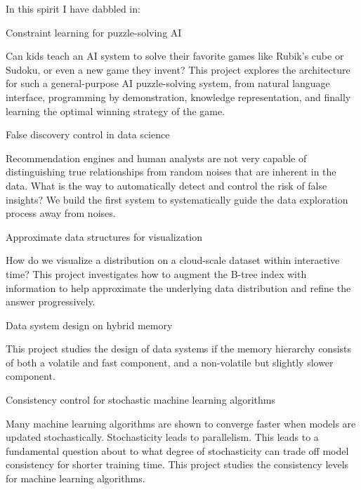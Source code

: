 \documentclass[letterpaper]{article}
\renewenvironment{itemize}{
  \begin{list}{}{
    \setlength{\leftmargin}{1.5em}
  }
}{
  \end{list}
}
\begin{document}
In this spirit I have dabbled in:
\begin{itemize}
	\item Constraint learning for puzzle-solving AI 
		\begin{itemize} 
			\item Can kids teach an AI system to solve their favorite games like Rubik's cube or Sudoku, or even a new game they invent?  This project explores the architecture for such a general-purpose AI puzzle-solving system, from natural language interface, programming by demonstration, knowledge representation, and finally learning the optimal winning strategy of the game.  
		\end{itemize}
	\item False discovery control in data science
		\begin{itemize}
			\item Recommendation engines and human analysts are not very capable of distinguishing true relationships from random noises that are inherent in the data.   What is the way to automatically detect and control the risk of false insights?  We build the first system to systematically guide the data exploration process away from noises.
		\end{itemize}
	\item Approximate data structures for visualization
		\begin{itemize}
			\item How do we visualize a distribution on a cloud-scale dataset within interactive time?  This project investigates how to augment the B-tree index with information to help approximate the underlying data distribution and refine the answer progressively.
		\end{itemize}
	\item Data system design on hybrid memory
		\begin{itemize}
			\item This project studies the design of data systems if the memory hierarchy consists of both a volatile and fast component, and a non-volatile but slightly slower component.  
		\end{itemize}
	\item Consistency control for stochastic machine learning algorithms
		\begin{itemize}
			\item Many machine learning algorithms are shown to converge faster when models are updated stochastically.  Stochasticity leads to parallelism.  This leads to a fundamental question about to what degree of stochasticity can trade off model consistency for shorter training time.  This project studies the consistency levels for machine learning algorithms.

\end{itemize}
\end{itemize}
\end{document}
